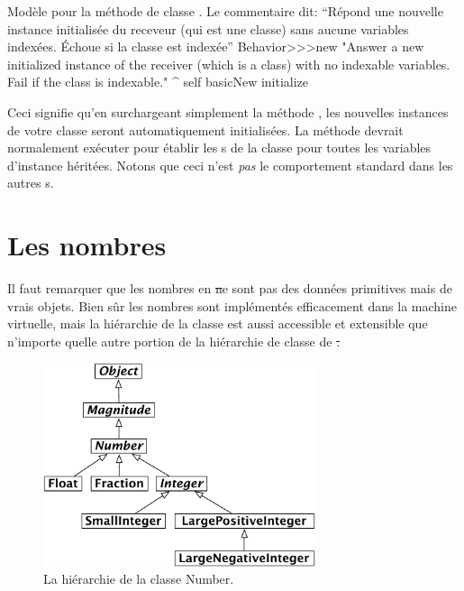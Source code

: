 \documentclass[a4paper,10pt,twoside]{book}
\begin{document}
\begin{method}{Mod\`ele pour la m\'ethode de classe . Le commentaire dit: ``R\'epond une nouvelle instance initialis\'ee du receveur (qui est une classe) sans aucune variables index\'ees. \'Echoue si la classe est index\'ee''}
Behavior>>>new
    "Answer a new initialized instance of the receiver (which is a class) with no indexable variables. Fail if the class is indexable."
    ^ self basicNew initialize
\end{method}

Ceci signifie qu'en surchargeant simplement la méthode  , les nouvelles instances de votre classe seront automatiquement initialis\'ees. La m\'ethode  devrait normalement ex\'ecuter  pour \'etablir les s de la classe pour toutes les variables d'instance h\'erit\'ees.
Notons que ceci n'est \emph{pas} le comportement standard dans les autres \st{}s.

\section{Les nombres}
\label{sec:Number}
Il faut remarquer que les nombres en \st ne sont pas des donn\'ees primitives mais de vrais objets. Bien s\^ur les nombres sont impl\'ement\'es efficacement dans la machine virtuelle, mais la hi\'erarchie de la classe  est aussi accessible et extensible que n'importe quelle autre portion de la hi\'erarchie de classe de \st.

\begin{figure}[ht]
\centerline {\includegraphics[width=8cm]{NumberHierarchy}}
\caption{La hi\'erarchie de la classe Number.\label{fig:numbers}}
\end{figure}
\end{document}
